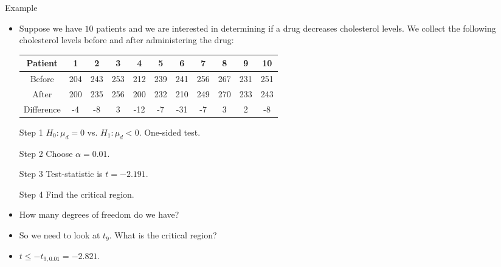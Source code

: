 \documentclass[10pt, xcolor=table]{beamer}
\begin{document}
\begin{frame}{Example}
\begin{itemize}
\setlength{\itemsep}{8pt}
\item Suppose we have $10$ patients and we are interested in determining if a drug decreases cholesterol levels. We collect the following cholesterol levels before and after administering the drug:
{\scriptsize 
\begin{table}[]
\begin{tabular}{|c|c|c|c|c|c|c|c|c|c|c|}
\hline
Patient    & 1   & 2   & 3   & 4   & 5   & 6   & 7   & 8   & 9   & 10  \\ \hline
Before     & 204 & 243 & 253 & 212 & 239 & 241 & 256 & 267 & 231 & 251 \\ \hline
After      & 200 & 235 & 256 & 200 & 232 & 210 & 249 & 270 & 233 & 243 \\ \hline
Difference & -4  & -8  & 3   & -12 & -7  & -31 & -7  & 3   & 2   & -8  \\ \hline
\end{tabular}
\end{table}
}
\item[Step 1] $H_0: \mu_d = 0$ vs. $H_1: \mu_d < 0$. One-sided test.    
\item[Step 2] Choose $\alpha = 0.01$. 
\item[Step 3] Test-statistic is $t = -2.191$.
\item[Step 4] Find the critical region.
\item<2->[] How many degrees of freedom do we have? 
\item<4->[] So we need to look at $t_{9}$. What is the critical region?
\item<5->[] $t \leq -t_{9, 0.01} = -2.821$.
\end{itemize}
\end{frame}
\end{document}
